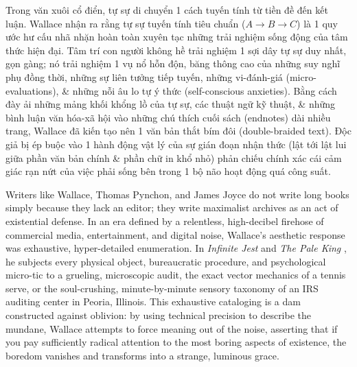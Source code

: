 \documentclass[11pt]{article}
\begin{document}
Trong văn xuôi cổ điển, tự sự di chuyển 1 cách tuyến tính từ tiền đề đến kết luận. Wallace nhận ra rằng tự sự tuyến tính tiêu chuẩn ($A \to B \to C$) là 1 quy ước hư cấu nhã nhặn hoàn toàn xuyên tạc những trải nghiệm sống động của tâm thức hiện đại. Tâm trí con người không hề trải nghiệm 1 sợi dây tự sự duy nhất, gọn gàng; nó trải nghiệm 1 vụ nổ hỗn độn, băng thông cao của những suy nghĩ phụ đồng thời, những sự liên tưởng tiếp tuyến, những vi-đánh-giá (micro-evaluations), \& những nỗi âu lo tự ý thức (self-conscious anxieties). Bằng cách đày ải những mảng khối khổng lồ của tự sự, các thuật ngữ kỹ thuật, \& những bình luận văn hóa-xã hội vào những chú thích cuối sách (endnotes) dài nhiều trang, Wallace đã kiến tạo nên 1 văn bản thắt bím đôi (double-braided text). Độc giả bị ép buộc vào 1 hành động vật lý của sự gián đoạn nhận thức (lật tới lật lui giữa phần văn bản chính \& phần chữ in khổ nhỏ) phản chiếu chính xác cái cảm giác rạn nứt của việc phải sống bên trong 1 bộ não hoạt động quá công suất.

\begin{center}
\end{center}

Writers like Wallace, Thomas Pynchon, and James Joyce do not write long books simply because they lack an editor; they write maximalist archives as an act of existential defense. In an era defined by a relentless, high-decibel firehose of commercial media, entertainment, and digital noise, Wallace's aesthetic response was exhaustive, hyper-detailed enumeration. In \textit{Infinite Jest} \cite{Wallace_jest} and \textit{The Pale King} \cite{wallace2011pale}, he subjects every physical object, bureaucratic procedure, and psychological micro-tic to a grueling, microscopic audit, the exact vector mechanics of a tennis serve, or the soul-crushing, minute-by-minute sensory taxonomy of an IRS auditing center in Peoria, Illinois. This exhaustive cataloging is a dam constructed against oblivion: by using technical precision to describe the mundane, Wallace attempts to force meaning out of the noise, asserting that if you pay sufficiently radical attention to the most boring aspects of existence, the boredom vanishes and transforms into a strange, luminous grace.
\end{document}
